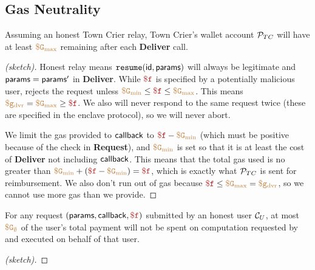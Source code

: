 \subsection{Gas Neutrality}


\begin{theorem}
Assuming an honest Town Crier relay,
Town Crier's wallet account ${\cal P}_{TC}$ will have at least $\tt {\color{brown} \$G_\text{max} }$ remaining after each {\bf Deliver} call.
\end{theorem}

\begin{proof}[(sketch)]
Honest relay means $\texttt{resume}({\sf id}, {\sf params})$ will always be legitimate and ${\sf params} = {\sf params}'$ in {\bf Deliver}.
While $\fee$ is specified by a potentially malicious user, \tcont rejects the request unless $\constgasmin \leq \fee \leq \constgasmax$.
This means $\gasdeliver = \constgasmax \geq \fee$.
We also will never respond to the same request twice (these are specified in the enclave protocol), so we will never abort.

We limit the gas provided to ${\sf callback}$ to $\fee - \constgasmin$ (which must be positive because of the check in {\bf Request}),
and $\tt {\color{brown} \$G_\text{min} }$ is set so that it is at least the cost of {\bf Deliver} not including ${\sf callback}$.
This means that the total gas used is no greater than $\constgasmin + (\fee - \constgasmin) = \fee$, which is exactly what ${\cal P}_{TC}$ is sent for reimbursement.
We also don't run out of gas because $\fee \leq \constgasmax = \gasdeliver$, so we cannot use more gas than we provide.
\end{proof}


\begin{theorem}
For any request $(\dgform, \dgcallback, \fee)$ submitted by an honest user ${\cal C}_U$,
at most $\tt {\color{brown} \$G_\emptyset }$ of the user's total payment will not be spent on computation requested by and executed on behalf of that user.
\end{theorem}

\begin{proof}[(sketch)]
\end{proof}



